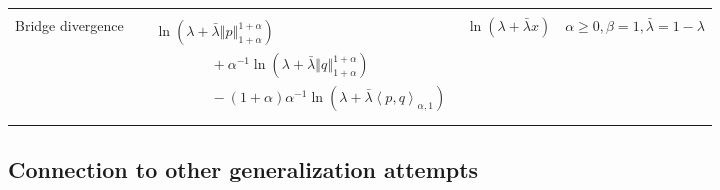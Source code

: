 \documentclass[11pt]{article}
\theoremstyle{plain}
\theoremstyle{remark}
\newcommand{\norm}[1]{\left\Vert #1 \right\Vert}
\newcommand{\inner}[1]{\left\langle #1\right\rangle}
\begin{document}
\begin{table}[!t]
{\begin{tabular}{llll}
            \midrule                                         \\[-2ex]
            \makecell[l]{Bridge divergence \\ \citep{kuchibhotla2019statistical}}                                                            &
            $\begin{aligned}
                     & \ln(\lambda + \bar{\lambda} \norm{p}_{1+\alpha}^{1+\alpha})                              \\[-0.2ex]
                     & \qquad \qquad + \alpha^{-1} \ln(\lambda + \bar{\lambda} \norm{q}_{1+\alpha}^{1+\alpha})    \\[-0.2ex]
                     & \qquad \qquad - (1+\alpha)\alpha^{-1} \ln(\lambda + \bar{\lambda} \inner{p, q}_{\alpha,1}) \\[0.5ex]
                \end{aligned}$ & $\ln(\lambda + \bar{\lambda}x)$                                                                                                                                                 & $\alpha \geq 0, \beta = 1, \bar{\lambda} = 1 - \lambda$                                                                                                                                                                                     \\
            \bottomrule
        \end{tabular}}
\end{table}

\subsection{Connection to other generalization attempts}\label{sec:other-generalization}
\end{document}

